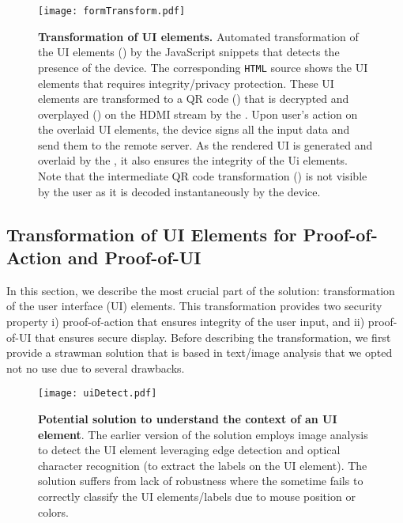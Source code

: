 \begin{figure*}[t]
\centering
\texttt{[image: formTransform.pdf]}
\caption{\textbf{Transformation of UI elements.} Automated transformation of the UI elements (\one) by the \name JavaScript snippets that detects the presence of the device. The corresponding \texttt{HTML} source shows the UI elements that requires integrity/privacy protection. These UI elements are transformed to a QR code (\two) that is decrypted and overplayed (\three) on the HDMI stream by the \device. Upon user's action on the overlaid UI elements, the device signs all the input data and send them to the remote server. As the rendered UI is generated and overlaid by the \device, it also ensures the integrity of the Ui elements. Note that the intermediate QR code transformation (\two) is not visible by the user as it is decoded instantaneously by the device.}
\label{fig:transformation}
\end{figure*}


\subsection{Transformation of UI Elements for Proof-of-Action and Proof-of-UI}
\label{sec:systemDesign:transformation}


In this section, we describe the most crucial part of the \name solution: transformation of the user interface (UI) elements. This transformation provides two security property i) proof-of-action that ensures integrity of the user input, and ii) proof-of-UI that ensures secure display. Before describing the transformation, we first provide a strawman solution that is based in text/image analysis that we opted not no use due to several drawbacks.   

\begin{figure}[!htpb]
\centering
\texttt{[image: uiDetect.pdf]}
\caption{\textbf{Potential solution to understand the context of an UI element}. The earlier version of the \name solution employs image analysis to detect the UI element leveraging edge detection and optical character recognition (to extract the labels on the UI element). The solution suffers from lack of robustness where the \device sometime fails to correctly classify the UI elements/labels due to mouse position or colors.}
\label{fig:uiDetect}
\centering
\end{figure}

